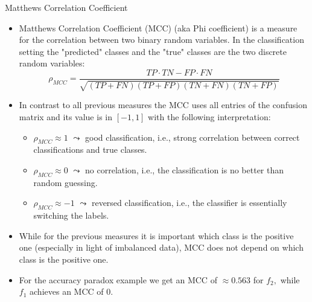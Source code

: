 \documentclass[11pt,compress,t,notes=noshow, xcolor=table]{beamer}
\begin{document}
\begin{vbframe}{Matthews Correlation Coefficient}
	\footnotesize{
	\begin{itemize}
		\item Matthews Correlation Coefficient (MCC) (aka Phi coefficient) is a measure for the correlation between two binary random variables. In the classification setting the "predicted" classes and the "true" classes are the two discrete random variables:
%		
		$$   \rho_{MCC} = \frac{TP\cdot TN - FP \cdot FN}{\sqrt{(TP+FN)(TP+FP)(TN+FN)(TN+FP)}}$$
%		
		 \item In contrast to all previous measures the MCC uses all entries of the confusion matrix and its value is in $[-1,1]$ with the following interpretation:
%		 
		\begin{itemize}
			\footnotesize
			\item $\rho_{MCC} \approx 1$ $\leadsto$ good classification, i.e., strong correlation between correct classifications and true classes.
			\item $\rho_{MCC} \approx 0$ $\leadsto$ no correlation, i.e., the classification is no better than random guessing.
			\item $\rho_{MCC} \approx -1$ $\leadsto$ reversed classification, i.e., the classifier is essentially switching the labels.
		\end{itemize}
	 \item While for the previous measures it is important which class is the positive one (especially in light of imbalanced data), MCC does not depend on which class is the positive one.
%		
	\item For the accuracy paradox example we get an MCC of $\approx 0.563$ for $f_2,$ while $f_1$ achieves an MCC of 0. 
\end{itemize}
	}
\end{vbframe}
\end{document}
